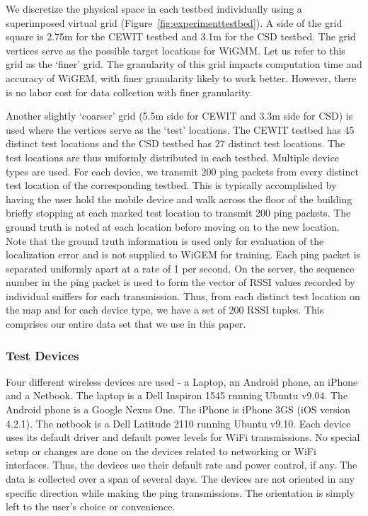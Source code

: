We discretize the physical space in each testbed individually using 
a superimposed virtual grid (Figure~\ref{fig:experimenttestbed}). A side of the grid square
is 2.75m for the CEWIT testbed and 3.1m for the CSD testbed. The grid vertices serve as the possible
target locations for WiGMM. Let us refer to this grid as the `finer' grid.  The granularity of this grid impacts
computation time and accuracy of WiGEM, with finer granularity likely to work better. However, there is no 
labor cost for data collection with finer granularity. 

Another slightly `coarser' grid  (5.5m side for CEWIT and 3.3m side for CSD) is used where the vertices
serve as
the `test' locations. The CEWIT testbed has 45 distinct test locations  and the CSD testbed has 27 distinct test locations. The test locations are thus uniformly distributed in each testbed.  Multiple device types are used. For each device, we transmit 200 ping packets from every distinct test location of the corresponding testbed. This is typically accomplished by having 
the user hold the mobile device and walk across the floor of the building briefly stopping at each marked test location to transmit 200 ping packets. The ground truth is noted at each location before moving on to the new location. Note that the ground truth information is used only for evaluation of the localization error and is not supplied to WiGEM for training. Each ping packet is separated uniformly apart at a rate of 1 per second. On the server, the sequence number in the ping packet is used to form the vector of RSSI values recorded by individual sniffers for each transmission. Thus, from each distinct test location on the map and for each device type, we have a set of 200 RSSI tuples. This comprises our entire data set that we use in this paper. 

\subsubsection{Test Devices}
\label{subsubsec:testdevices}

Four different wireless devices are used - a Laptop, an Android phone, an iPhone and a Netbook. The laptop is a Dell Inspiron 1545 running Ubuntu v9.04. The Android phone is a Google Nexus One. The iPhone is iPhone 3GS (iOS version 4.2.1). The netbook is a Dell Latitude 2110 running Ubuntu v9.10. Each device uses its default driver and default power levels for WiFi transmissions. %
No special setup or changes are done on the devices related to networking or WiFi interfaces. 
Thus, the devices use their default rate and power control, if any.
The data is collected over a span of several days. The devices are not oriented
in any specific direction while making the ping transmissions. The orientation is simply left to the user's choice or convenience. 

